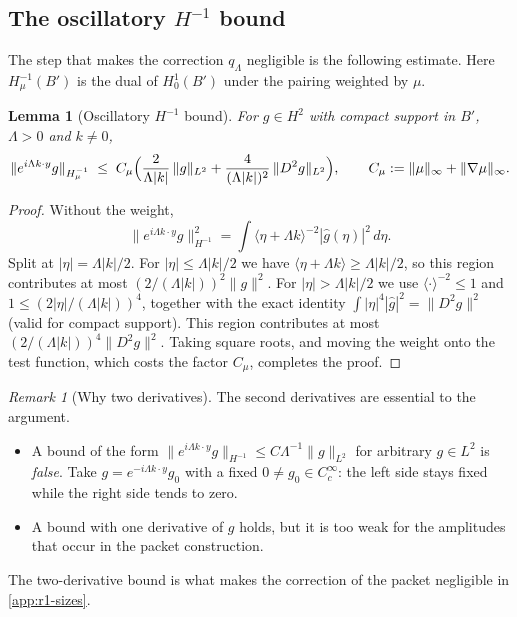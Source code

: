 \documentclass[11pt]{article}
\theoremstyle{plain}
\newtheorem{lemma}[theorem]{Lemma}
\theoremstyle{definition}
\theoremstyle{remark}
\newtheorem{remark}[theorem]{Remark}
\begin{document}
\subsection{The oscillatory \texorpdfstring{$H^{-1}$}{H\^{}-1} bound}\label{sec:osc}

The step that makes the correction $q_\Lambda$ negligible is the following estimate. Here $H^{-1}_\mu(B')$ is the dual of $H^1_0(B')$ under the pairing weighted by $\mu$.

\begin{lemma}[Oscillatory $H^{-1}$ bound]\label{lem:osc}
For $g \in H^2$ with compact support in $B'$, $\Lambda > 0$ and $k \neq 0$,
\[
  \|e^{i\Lambda k\cdot y}g\|_{H^{-1}_\mu}
  \;\le\; C_\mu\Bigl(\frac{2}{\Lambda|k|}\,\|g\|_{L^2} + \frac{4}{(\Lambda|k|)^2}\,\|D^2g\|_{L^2}\Bigr),
  \qquad C_\mu := \|\mu\|_\infty + \|\nabla\mu\|_\infty .
\]
\end{lemma}

\begin{proof}
Without the weight,
\[
  \|e^{i\Lambda k\cdot y}g\|_{H^{-1}}^2 = \int \langle\eta + \Lambda k\rangle^{-2}|\hat g(\eta)|^2\,d\eta .
\] Split at $|\eta| = \Lambda|k|/2$. For $|\eta| \le \Lambda|k|/2$ we have $\langle\eta + \Lambda k\rangle \ge \Lambda|k|/2$, so this region contributes at most $(2/(\Lambda|k|))^2\|g\|^2$. For $|\eta| > \Lambda|k|/2$ we use $\langle\cdot\rangle^{-2} \le 1$ and $1 \le (2|\eta|/(\Lambda|k|))^4$, together with the exact identity $\int|\eta|^4|\hat g|^2 = \|D^2g\|^2$ (valid for compact support). This region contributes at most $(2/(\Lambda|k|))^4\|D^2g\|^2$. Taking square roots, and moving the weight onto the test function, which costs the factor $C_\mu$, completes the proof.
\end{proof}

\begin{remark}[Why two derivatives]\label{rem:two-derivatives}
The second derivatives are essential to the argument.
\begin{itemize}
  \item A bound of the form $\|e^{i\Lambda k\cdot y}g\|_{H^{-1}} \le C\Lambda^{-1}\|g\|_{L^2}$ for arbitrary $g \in L^2$ is \emph{false}. Take $g = e^{-i\Lambda k\cdot y}g_0$ with a fixed $0 \neq g_0 \in C^\infty_c$: the left side stays fixed while the right side tends to zero.
  \item A bound with one derivative of $g$ holds, but it is too weak for the amplitudes that occur in the packet construction.
\end{itemize}
The two-derivative bound is what makes the correction of the packet negligible in \cref{app:r1-sizes}.
\end{remark}
\end{document}
